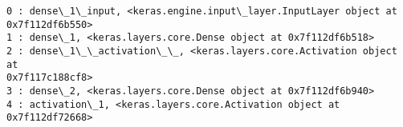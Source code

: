 \documentclass[11pt]{article}
\begin{document}
    \begin{Verbatim}[commandchars=\\\{\}]
0 : dense\_1\_input, <keras.engine.input\_layer.InputLayer object at
0x7f112df6b550>
1 : dense\_1, <keras.layers.core.Dense object at 0x7f112df6b518>
2 : dense\_1\_\_activation\_\_, <keras.layers.core.Activation object at
0x7f117c188cf8>
3 : dense\_2, <keras.layers.core.Dense object at 0x7f112df6b940>
4 : activation\_1, <keras.layers.core.Activation object at 0x7f112df72668>
    \end{Verbatim}


    
    
    
\end{document}
